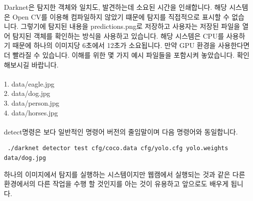 \documentclass{article}
\begin{document}
Darknet은 탐지한 객체와 일치도, 발견하는데 소요된 시간을 인쇄합니다.
해당 시스템은 Open CV를 이용해 컴파일하지 않았기 떄문에 탐지를 직접적으로 표시할 수 없습니다. 그렇기에 탐지된 내용을 predictions.png로 저장하고 사용자는 저장된 파일을 열어 탐지된 객체를 확인하는 방식을 사용하고 있습니다. 
해당 시스템은 CPU를 사용하기 때문에 하나의 이미지당 6초에서 12초가 소요됩니다. 
만약 GPU 환경을 사용한다면 더 빨라질 수 있습니다. 이해를 위한 몇 가지 예시 파일들을 포함시켜 놓았습니다. 확인해보시길 바랍니다. \\\\
1. data/eagle.jpg \\
2. data/dog.jpg \\
3. data/person.jpg \\
4. data/horses.jpg\\
\\
detect명령은 보다 일반적인 명령어 버전의 줄임말이며 다음 명령어와 동일합니다.

\begin{lstlisting}
 ./darknet detector test cfg/coco.data cfg/yolo.cfg yolo.weights data/dog.jpg 
\end{lstlisting}

하나의 이미지에서 탐지를 실행하는 시스템이지만 
웹캠에서 실행되는 것과 같은 다른 환경에서의 다른 작업을 수행 할 것인지를 아는 것이 유용하고
앞으로도 배우게 됩니다. 
\end{document}
